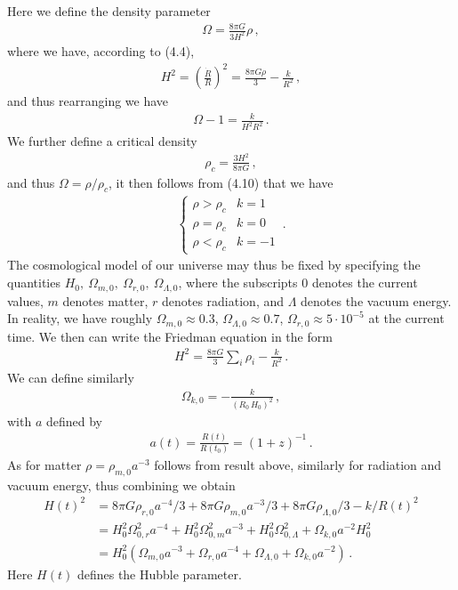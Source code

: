 \documentclass[11pt, onesided]{book}
\theoremstyle{break}
\theoremstyle{break}
\begin{document}
Here we define the density parameter
\begin{align*}
\Omega = \frac{8\pi G}{3H^2} \rho\,,
\end{align*}
where we have, according to (4.4),
\begin{align*}
H^2 = \left( \frac{\dot{R}}{R}\right)^2 = \frac{8\pi G\rho}{3} - \frac{k}{R^2}\,,
\end{align*}
and thus rearranging we have
\begin{align}
\Omega-1 =  \frac{k}{H^2 R^2}\,.
\end{align}
We further define a critical density
\begin{align*}
\rho_c = \frac{3H^2}{8\pi G}\,,
\end{align*}
and thus $\Omega = \rho/ \rho_c$,  it then follows from (4.10) that we have
\begin{align*}
\begin{cases}
\rho > \rho_c & k=1\\
\rho = \rho_c & k=0\\
\rho < \rho_c & k=-1
\end{cases}\,.
\end{align*}
The cosmological model of our universe may thus be fixed by specifying the quantities
$H_0,\ \Omega_{m, 0},\ \Omega_{r, 0},\ \Omega_{\Lambda, 0}$, where the subscripts $0$ denotes the current values, $m$ denotes matter, $r$ denotes radiation, and $\Lambda$ denotes the vacuum energy. 
In reality, we have roughly $\Omega_{m,0} \approx 0.3$, $\Omega_{\Lambda,0} \approx 0.7$, $\Omega_{r,0} \approx 5\cdot 10^{-5}$ at the 
current time. We then can write the Friedman equation in the form
\begin{align*}
H^2 = \frac{8\pi G}{3}\sum_i \rho_i - \frac{k}{R^2}\,.
\end{align*}
We can define similarly
\begin{align*}
\Omega_{k,0} =-\frac{k}{(R_0\,H_0)^2}\,,
\end{align*}
with $a$ defined by
\begin{align*}
a(t) = \frac{R(t)}{R(t_0)} = (1+z)^{-1}\,.
\end{align*}
As for matter $\rho = \rho_{m,0}a^{-3}$ follows from result above, similarly for radiation and vacuum energy, thus combining we obtain
\begin{align*}
H(t)^2 &= 
8\pi G\rho_{r,0}a^{-4}/3 +
8\pi G\rho_{m,0}a^{-3}/3 +
8\pi G\rho_{\Lambda,0}/3
- k/R(t)^2\\
&= H_0^2 \Omega_{0,r}^2 a^{-4} +
H_0^2 \Omega_{0,m}^2 a^{-3}  +
H_0^2 \Omega_{0,\Lambda}^2 + 
\Omega_{k,0}a^{-2}H_0^2
\\
&=H_0^2\left( \Omega_{m,0}a^{-3} + \Omega_{r,0}a^{-4} + \Omega_{\Lambda,0} + \Omega_{k,0}a^{-2}\right)\,.
\end{align*}
Here $H(t)$ defines the Hubble parameter. \\
\end{document}
